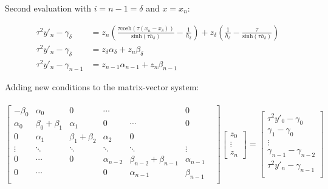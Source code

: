 \documentclass{article}
\begin{document}
  Second evaluation with $i=n-1 = \delta$ and $x = x_n$:

  \begin{align*}
           \tau^2y'_n
           -
           \gamma_{\delta}
           &=
           z_{n}
           (
             \frac{
               \tau\textrm{cosh}(\tau(x_n-x_{\delta}))
             }
             {
               \textrm{sinh}(\tau h_{\delta})
             }
             -
             \frac {
               1
             }
             {
               h_{\delta}
             }
           )
           +
           z_{\delta}
           (
             \frac {
               1
             }
             {
               h_{\delta}
             }
             -
             \frac{
               \tau
             }
             {
               \textrm{sinh}(\tau h_{\delta})
             }
           )
           \\
           \tau^2y'_n
           -
           \gamma_{\delta}
           &=
           z_{\delta} \alpha_{\delta}
           +
           z_{n}\beta_{\delta}
           \\
           \tau^2y'_n
           -
           \gamma_{n-1}
           &=
           z_{n-1} \alpha_{n-1}
           +
           z_{n}\beta_{n-1}
  \end{align*}

  Adding new conditions to the matrix-vector system: \\ \ \\
  $
  \begin{bmatrix}
    -\beta_0 & \alpha_0 & 0 & \cdots & & 0 \\
  \alpha_0 & \beta_0 + \beta_1 & \alpha_1 & 0 & \cdots & 0 \\
  0 & \alpha_1 & \beta_1 + \beta_2 & \alpha_2 & 0 & \\
  \vdots & \ddots & \ddots & \ddots & \ddots &\vdots \\
  0 &  \cdots & 0 & \alpha_{n-2} & \beta_{n-2} + \beta_{n-1} & \alpha_{n-1} & \\
  0 & \cdots &  & 0 & \alpha_{n-1} & \beta_{n-1} \\
  \end{bmatrix}
  \begin{bmatrix}
    z_0 \\
    \vdots \\
    z_n
  \end{bmatrix}
  =
  \begin{bmatrix}
    \tau^2y'_0-\gamma_0 \\
   \gamma_1 - \gamma_0\\
    \vdots \\
    \gamma_{n-1} - \gamma_{n-2}\\
    \tau^2y'_n-\gamma_{n-1}\\
  \end{bmatrix}
  $ \\ \ \\
\end{document}
